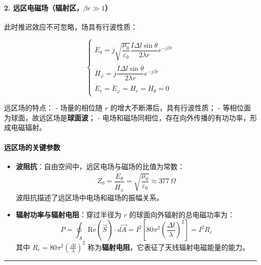 \paragraph{2. 远区电磁场（辐射区，$\beta r \gg 1$）}
此时推迟效应不可忽略，场具有行波性质：
\begin{formulaBox}
\[
\begin{cases}
\dot{E}_\theta = j\sqrt{\dfrac{\mu_0}{\varepsilon_0}} \dfrac{\dot{I} \Delta l \sin\theta}{2\lambda r} e^{-j\beta r} \\[6pt]
\dot{H}_\varphi = j\dfrac{\dot{I} \Delta l \sin\theta}{2\lambda r} e^{-j\beta r} \\[6pt]
\dot{E}_r = \dot{E}_\varphi = \dot{H}_r = \dot{H}_\theta = 0
\end{cases}
\]
\end{formulaBox}

远区场的特点：
- 场量的相位随 $r$ 的增大不断滞后，具有行波性质；
- 等相位面为球面，故远区场是\textbf{球面波}；
- 电场和磁场同相位，存在向外传播的有功功率，形成电磁辐射。

\paragraph{远区场的关键参数}
\begin{itemize}
    \item \textbf{波阻抗}：自由空间中，远区电场与磁场的比值为常数：
    \[
    Z_0 = \frac{\dot{E}_\theta}{\dot{H}_\varphi} = \sqrt{\frac{\mu_0}{\varepsilon_0}} \approx 377\,\Omega
    \]
    波阻抗描述了远区场中电场和磁场的振幅关系。

    \item \textbf{辐射功率与辐射电阻}：穿过半径为 $r$ 的球面向外辐射的总电磁功率为：
    \[
    P = \oint_{A} \text{Re}(\dot{\vec{S}}) \cdot d\vec{A} = I^2 \left[ 80\pi^2 \left( \frac{\Delta l}{\lambda} \right)^2 \right] = I^2 R_e
    \]
    其中 $R_e = 80\pi^2 \left( \frac{\Delta l}{\lambda} \right)^2$ 称为\textbf{辐射电阻}，它表征了天线辐射电磁能量的能力。
\end{itemize}

\vspace{0.8cm}\hrule\vspace{0.8cm}